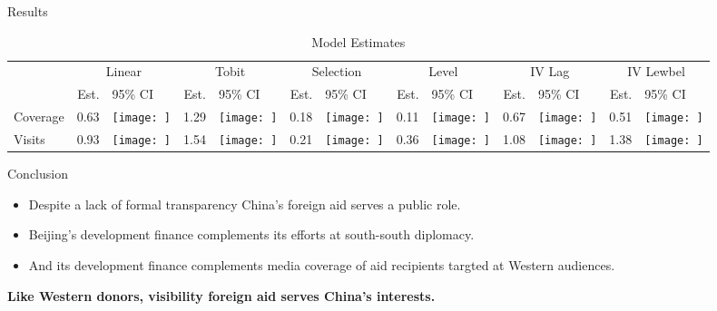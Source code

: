\documentclass{beamer}
\begin{document}
\begin{frame}{Results}

\begin{table}

\caption{Model Estimates}
\centering
\begin{tabular}[t]{lr>{}lr>{}lr>{}lr>{}lr>{}lr>{}l}
\toprule
\multicolumn{1}{c}{ } & \multicolumn{2}{c}{Linear} & \multicolumn{2}{c}{Tobit} & \multicolumn{2}{c}{Selection} & \multicolumn{2}{c}{Level} & \multicolumn{2}{c}{IV Lag} & \multicolumn{2}{c}{IV Lewbel} \\
\cmidrule(l{3pt}r{3pt}){2-3} \cmidrule(l{3pt}r{3pt}){4-5} \cmidrule(l{3pt}r{3pt}){6-7} \cmidrule(l{3pt}r{3pt}){8-9} \cmidrule(l{3pt}r{3pt}){10-11} \cmidrule(l{3pt}r{3pt}){12-13}
  & Est. & 95\% CI & Est. & 95\% CI & Est. & 95\% CI & Est. & 95\% CI & Est. & 95\% CI & Est. & 95\% CI\\
\midrule
Coverage & 0.63 & \texttt{[image: ]} & 1.29 & \texttt{[image: ]} & 0.18 & \texttt{[image: ]} & 0.11 & \texttt{[image: ]} & 0.67 & \texttt{[image: ]} & 0.51 & \texttt{[image: ]}\\
Visits & 0.93 & \texttt{[image: ]} & 1.54 & \texttt{[image: ]} & 0.21 & \texttt{[image: ]} & 0.36 & \texttt{[image: ]} & 1.08 & \texttt{[image: ]} & 1.38 & \texttt{[image: ]}\\
\bottomrule
\end{tabular}
\end{table}

\end{frame}



\begin{frame}{Conclusion}


\begin{itemize}
    \item Despite a lack of formal transparency China's foreign aid serves a public role.
    \item Beijing's development finance complements its efforts at south-south diplomacy.
    \item And its development finance complements media coverage of aid recipients targted at Western audiences.
\end{itemize}

\textbf{Like Western donors, visibility foreign aid serves China’s interests.}
\end{frame}
\end{document}
